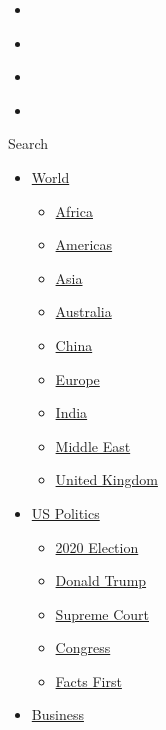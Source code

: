 \begin{itemize}
\item
\end{itemize}

\begin{itemize}
\item
\end{itemize}

\begin{itemize}
\item
\end{itemize}

\begin{itemize}
\item
\end{itemize}

Search

\begin{itemize}
\tightlist
\item
  \href{/world}{World}

  \begin{itemize}
  \tightlist
  \item
    \href{/africa}{Africa}
  \item
    \href{/americas}{Americas}
  \item
    \href{/asia}{Asia}
  \item
    \href{/australia}{Australia}
  \item
    \href{/china}{China}
  \item
    \href{/europe}{Europe}
  \item
    \href{/india}{India}
  \item
    \href{/middle-east}{Middle East}
  \item
    \href{/uk}{United Kingdom}
  \end{itemize}
\item
  \href{/politics}{US Politics}

  \begin{itemize}
  \tightlist
  \item
    \href{/election/2020}{2020 Election}
  \item
    \href{/specials/politics/president-donald-trump-45}{Donald Trump}
  \item
    \href{/specials/politics/supreme-court-nine}{Supreme Court}
  \item
    \href{/specials/politics/congress}{Congress}
  \item
    \href{/specials/politics/fact-check-politics}{Facts First}
  \end{itemize}
\item
  \href{/business}{Business}


\end{itemize}
